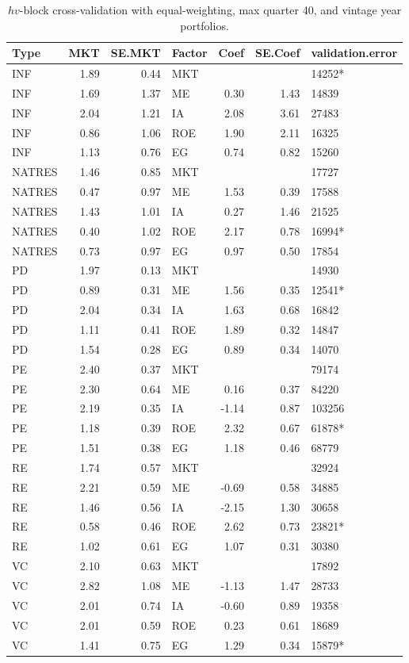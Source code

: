 \documentclass[12pt]{article}
\begin{document}
\begin{table}[ht]
	\centering
	\begin{tabular}{lrrlrrl}
		Type & MKT & SE.MKT & Factor & Coef & SE.Coef & validation.error \\ 
		\hline
		\hline
		INF & 1.89 & 0.44 & MKT &  &  & 14252* \\ 
		INF & 1.69 & 1.37 & ME & 0.30 & 1.43 & 14839 \\ 
		INF & 2.04 & 1.21 & IA & 2.08 & 3.61 & 27483 \\ 
		INF & 0.86 & 1.06 & ROE & 1.90 & 2.11 & 16325 \\ 
		INF & 1.13 & 0.76 & EG & 0.74 & 0.82 & 15260 \\ 
		\hline
		NATRES & 1.46 & 0.85 & MKT &  &  & 17727 \\ 
		NATRES & 0.47 & 0.97 & ME & 1.53 & 0.39 & 17588 \\ 
		NATRES & 1.43 & 1.01 & IA & 0.27 & 1.46 & 21525 \\ 
		NATRES & 0.40 & 1.02 & ROE & 2.17 & 0.78 & 16994* \\ 
		NATRES & 0.73 & 0.97 & EG & 0.97 & 0.50 & 17854 \\ 
		\hline
		PD & 1.97 & 0.13 & MKT &  &  & 14930 \\ 
		PD & 0.89 & 0.31 & ME & 1.56 & 0.35 & 12541* \\ 
		PD & 2.04 & 0.34 & IA & 1.63 & 0.68 & 16842 \\ 
		PD & 1.11 & 0.41 & ROE & 1.89 & 0.32 & 14847 \\ 
		PD & 1.54 & 0.28 & EG & 0.89 & 0.34 & 14070 \\ 
		\hline
		PE & 2.40 & 0.37 & MKT &  &  & 79174 \\ 
		PE & 2.30 & 0.64 & ME & 0.16 & 0.37 & 84220 \\ 
		PE & 2.19 & 0.35 & IA & -1.14 & 0.87 & 103256 \\ 
		PE & 1.18 & 0.39 & ROE & 2.32 & 0.67 & 61878* \\ 
		PE & 1.51 & 0.38 & EG & 1.18 & 0.46 & 68779 \\ 
		\hline
		RE & 1.74 & 0.57 & MKT &  &  & 32924 \\ 
		RE & 2.21 & 0.59 & ME & -0.69 & 0.58 & 34885 \\ 
		RE & 1.46 & 0.56 & IA & -2.15 & 1.30 & 30658 \\ 
		RE & 0.58 & 0.46 & ROE & 2.62 & 0.73 & 23821* \\ 
		RE & 1.02 & 0.61 & EG & 1.07 & 0.31 & 30380 \\ 
		\hline
		VC & 2.10 & 0.63 & MKT &  &  & 17892 \\ 
		VC & 2.82 & 1.08 & ME & -1.13 & 1.47 & 28733 \\ 
		VC & 2.01 & 0.74 & IA & -0.60 & 0.89 & 19358 \\ 
		VC & 2.01 & 0.59 & ROE & 0.23 & 0.61 & 18689 \\ 
		VC & 1.41 & 0.75 & EG & 1.29 & 0.34 & 15879* \\ 
		\hline
		\hline
	\end{tabular}
	\caption{$hv$-block cross-validation with equal-weighting, max quarter 40, and vintage year portfolios.} 
	\label{tab:cv_40_ew_dep_vyp}
\end{table}
\end{document}
